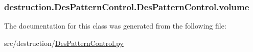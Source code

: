 \hypertarget{classdestruction_1_1_des_pattern_control_1_1_des_pattern_control_af9413103dba48d398eb60c0eebf1f411}{
\subsubsection[{volume}]{\setlength{\rightskip}{0pt plus 5cm}destruction.\-Des\-Pattern\-Control.\-Des\-Pattern\-Control.\-volume}}\label{classdestruction_1_1_des_pattern_control_1_1_des_pattern_control_af9413103dba48d398eb60c0eebf1f411}


The documentation for this class was generated from the following file\-:\begin{DoxyCompactItemize}
\item 
src/destruction/\hyperlink{_des_pattern_control_8py}{Des\-Pattern\-Control.\-py}\end{DoxyCompactItemize}
